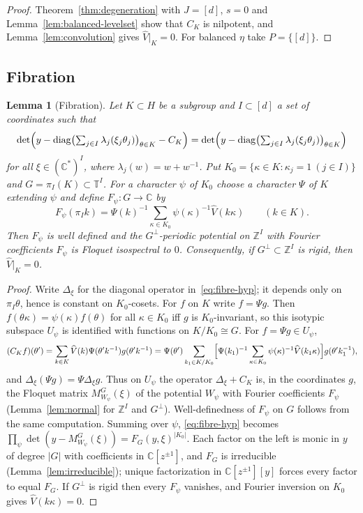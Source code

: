\documentclass[11pt,reqno]{amsart}
\newtheorem{lemma}[theorem]{Lemma}
\theoremstyle{definition}
\theoremstyle{remark}
\newcommand{\C}{\mathbb C}
\newcommand{\Z}{\mathbb Z}
\newcommand{\T}{\mathbb T}
\DeclareMathOperator{\diag}{diag}
\begin{document}
\begin{proof}
Theorem~\ref{thm:degeneration} with $J=[d]$, $s=0$ and Lemma~\ref{lem:balanced-levelset}
show that $C_K$ is nilpotent, and Lemma~\ref{lem:convolution} gives
$\widehat V|_K=0$.  For balanced $\eta$ take $P=\{[d]\}$.
\end{proof}

\subsection{Fibration}

\begin{lemma}[Fibration]\label{lem:fibration}
Let $K\subset H$ be a subgroup and $I\subset[d]$ a set of coordinates such that
\begin{equation}\label{eq:fibre-hyp}
 \det\Bigl(y-\diag\bigl(\textstyle\sum_{j\in I}\lambda_j(\xi_j\theta_j)\bigr)_{\theta\in K}-C_K\Bigr)
 =\det\Bigl(y-\diag\bigl(\textstyle\sum_{j\in I}\lambda_j(\xi_j\theta_j)\bigr)_{\theta\in K}\Bigr)
\end{equation}
for all $\xi\in(\C^*)^I$, where $\lambda_j(w)=w+w^{-1}$.  Put
$K_0=\{\kappa\in K:\kappa_j=1\ (j\in I)\}$ and $G=\pi_I(K)\subset\T^I$.  For a
character $\psi$ of $K_0$ choose a character $\Psi$ of $K$ extending $\psi$ and
define $F_\psi\colon G\to\C$ by
\[
 F_\psi(\pi_I k)=\Psi(k)^{-1}\sum_{\kappa\in K_0}\psi(\kappa)^{-1}\widehat V(k\kappa)\qquad(k\in K).
\]
Then $F_\psi$ is well defined and the $G^\perp$-periodic potential on $\Z^I$
with Fourier coefficients $F_\psi$ is Floquet isospectral to $0$.
Consequently, if $G^\perp\subset\Z^I$ is rigid, then $\widehat V|_K=0$.
\end{lemma}

\begin{proof}
Write $\Delta_\xi$ for the diagonal operator in~\eqref{eq:fibre-hyp}; it depends
only on $\pi_I\theta$, hence is constant on $K_0$-cosets.  For $f$ on $K$ write
$f=\Psi g$.  Then $f(\theta\kappa)=\psi(\kappa)f(\theta)$ for all $\kappa\in K_0$
iff $g$ is $K_0$-invariant, so this isotypic subspace $U_\psi$ is identified
with functions on $K/K_0\cong G$.  For $f=\Psi g\in U_\psi$,
\[
 (C_Kf)(\theta')=\sum_{k\in K}\widehat V(k)\Psi(\theta'k^{-1})g(\theta'k^{-1})
 =\Psi(\theta')\sum_{k_1\in K/K_0}\Bigl[\Psi(k_1)^{-1}\sum_{\kappa\in K_0}\psi(\kappa)^{-1}\widehat V(k_1\kappa)\Bigr]g(\theta'k_1^{-1}),
\]
and $\Delta_\xi(\Psi g)=\Psi\Delta_\xi g$.  Thus on $U_\psi$ the operator
$\Delta_\xi+C_K$ is, in the coordinates $g$, the Floquet matrix
$M^{G}_{W_\psi}(\xi)$ of the potential $W_\psi$ with Fourier coefficients
$F_\psi$ (Lemma~\ref{lem:normal} for $\Z^I$ and $G^\perp$).  Well-definedness of
$F_\psi$ on $G$ follows from the same computation.  Summing over $\psi$,
\eqref{eq:fibre-hyp} becomes
$\prod_{\psi}\det(y-M^G_{W_\psi}(\xi))=F_G(y,\xi)^{|K_0|}$.  Each factor on the
left is monic in $y$ of degree $|G|$ with coefficients in $\C[z^{\pm1}]$, and
$F_G$ is irreducible (Lemma~\ref{lem:irreducible}); unique factorization in
$\C[z^{\pm1}][y]$ forces every factor to equal $F_G$.  If $G^\perp$ is rigid then
every $F_\psi$ vanishes, and Fourier inversion on $K_0$ gives $\widehat V(k\kappa)=0$.
\end{proof}
\end{document}
